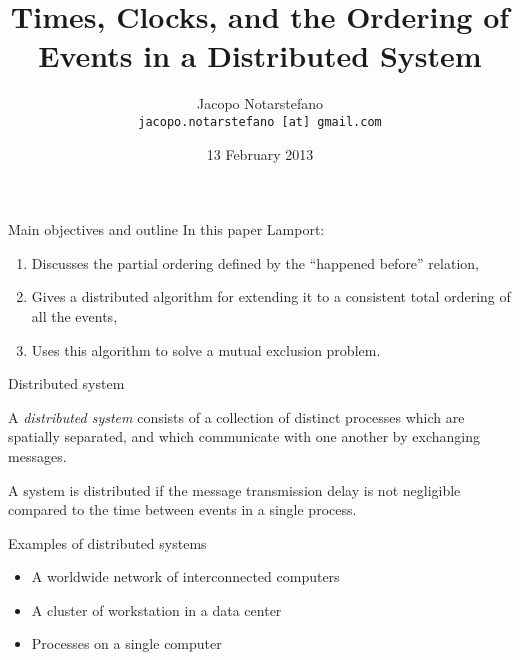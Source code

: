 \documentclass[12pt]{beamer}
\title{Times, Clocks, and the Ordering of Events in a Distributed System}
\author[Jacopo Notarstefano]{
    Jacopo Notarstefano\\
    \texttt{jacopo.notarstefano [at] gmail.com}
}
\date{13 February 2013}
\begin{document}
    \begin{frame}[plain]
        \titlepage
    \end{frame}

    \begin{frame}{Main objectives and outline}
        In this paper Lamport:
        \begin{enumerate}
            \item Discusses the partial ordering defined by the ``happened before''
            relation,
            \item Gives a distributed algorithm for extending it to a consistent total
            ordering of all the events,
            \item Uses this algorithm to solve a mutual exclusion problem.
        \end{enumerate}
    \end{frame}

    \begin{frame}{Distributed system}
        \begin{definition}
            A \emph{distributed system} consists of a collection of distinct processes
            which are spatially separated, and which communicate with one another
            by exchanging messages.

            A system is distributed if the message transmission delay is not
            negligible compared to the time between events in a single process.
        \end{definition}
    \end{frame}

    \begin{frame}{Examples of distributed systems}
        \begin{itemize}
            \item A worldwide network of interconnected computers
            \item A cluster of workstation in a data center
            \item Processes on a single computer
        \end{itemize}
    \end{frame}
\end{document}
